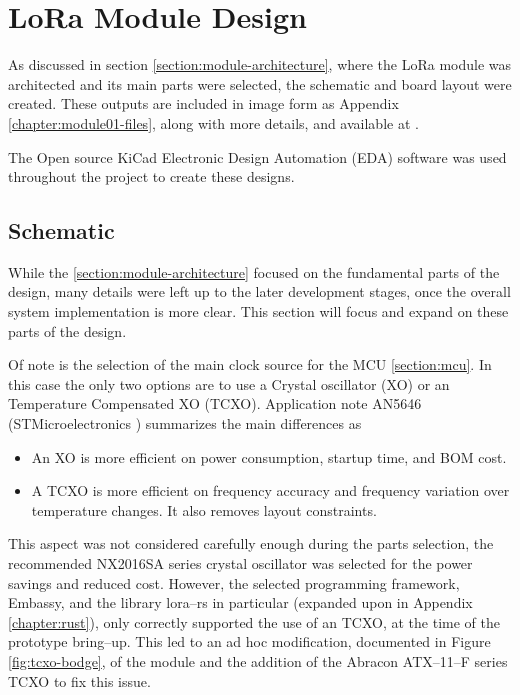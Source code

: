 
\section{LoRa Module Design}
As discussed in section \ref{section:module-architecture}, where the LoRa module was architected and its main parts were selected, the schematic and board layout were created. These outputs are included in image form as Appendix \ref{chapter:module01-files}, along with more details, and available at .

The Open source KiCad Electronic Design Automation (EDA) software was used throughout the project to create these designs.

\subsection{\label{section:module-schematic}Schematic}
While the \ref{section:module-architecture} focused on the fundamental parts of the design, many details were left up to the later development stages, once the overall system implementation is more clear. This section will focus and expand on these parts of the design.

Of note is the selection of the main clock source for the MCU \ref{section:mcu}. In this case the only two options are to use a Crystal oscillator (XO) or an Temperature Compensated XO (TCXO). Application note AN5646 (STMicroelectronics \cite{stmicroelectronics_how_nodate-1}) summarizes the main differences as
\begin{itemize}
    \item An XO is more efficient on power consumption, startup time, and BOM cost.
    \item A TCXO is more efficient on frequency accuracy and frequency variation over temperature changes. It also
    removes layout constraints.
\end{itemize}

This aspect was not considered carefully enough during the parts selection, the recommended NX2016SA series crystal oscillator was selected for the power savings and reduced cost. However, the selected programming framework, Embassy, and the library lora--rs in particular (expanded upon in Appendix \ref{chapter:rust}), only correctly supported the use of an TCXO, at the time of the prototype bring--up. This led to an ad hoc modification, documented in Figure \ref{fig:tcxo-bodge}, of the module and the addition of the Abracon ATX--11--F series TCXO to fix this issue.

